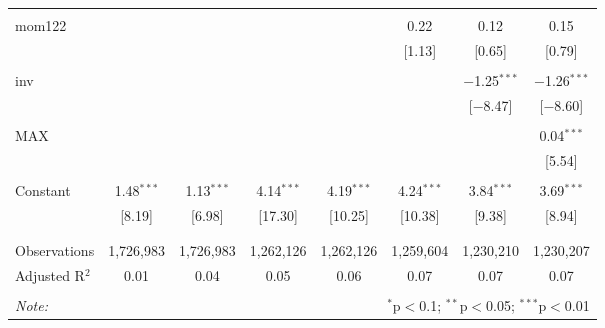 \documentclass[12pt]{article}
\begin{document}
\begin{table}[!htbp]
\begin{tabular}{@{\extracolsep{0pt}}lccccccc}
  & & & & & & & \\ 
 mom122 &  &  &  &  & 0.22 & 0.12 & 0.15 \\ 
  &  &  &  &  & [1.13] & [0.65] & [0.79] \\ 
  & & & & & & & \\ 
 inv &  &  &  &  &  & $-$1.25$^{***}$ & $-$1.26$^{***}$ \\ 
  &  &  &  &  &  & [$-$8.47] & [$-$8.60] \\ 
  & & & & & & & \\ 
 MAX &  &  &  &  &  &  & 0.04$^{***}$ \\ 
  &  &  &  &  &  &  & [5.54] \\ 
  & & & & & & & \\ 
 Constant & 1.48$^{***}$ & 1.13$^{***}$ & 4.14$^{***}$ & 4.19$^{***}$ & 4.24$^{***}$ & 3.84$^{***}$ & 3.69$^{***}$ \\ 
  & [8.19] & [6.98] & [17.30] & [10.25] & [10.38] & [9.38] & [8.94] \\ 
  & & & & & & & \\ 
\hline \\[-1.8ex] 
Observations & 1,726,983 & 1,726,983 & 1,262,126 & 1,262,126 & 1,259,604 & 1,230,210 & 1,230,207 \\ 
Adjusted R$^{2}$ & 0.01 & 0.04 & 0.05 & 0.06 & 0.07 & 0.07 & 0.07 \\ 
\hline 
\hline \\[-1.8ex] 
\textit{Note:}  & \multicolumn{7}{r}{$^{*}$p$<$0.1; $^{**}$p$<$0.05; $^{***}$p$<$0.01} \\ 
\end{tabular} 
\end{table}
\end{document}
